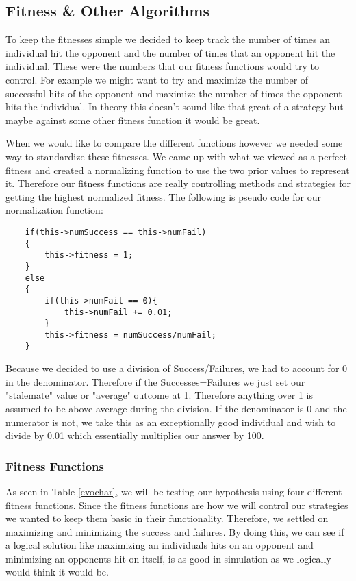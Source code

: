 \documentclass{acm_proc_article-sp}
\begin{document}
\subsection{Fitness \& Other Algorithms} %

To keep the fitnesses simple we decided to keep track the number of times an individual hit the opponent and the number of times that an opponent hit the individual. These were the numbers that our fitness functions would try to control. For example we might want to try and maximize the number of successful hits of the opponent and maximize the number of times the opponent hits the individual. In theory this doesn't sound like that great of a strategy but maybe against some other fitness function it would be great.

When we would like to compare the different functions however we needed some way to standardize these fitnesses. We came up with what we viewed as a perfect fitness and created a normalizing function to use the two prior values to represent it. Therefore our fitness functions are really controlling methods and strategies for getting the highest normalized fitness. The following is pseudo code for our normalization function:
\begin{verbatim}
    if(this->numSuccess == this->numFail)
    {
        this->fitness = 1;
    }
    else
    {
        if(this->numFail == 0){
            this->numFail += 0.01;
        }
        this->fitness = numSuccess/numFail;
    }
\end{verbatim}
Because we decided to use a division of Success/Failures, we had to account for 0 in the denominator. Therefore if the Successes=Failures we just set our "stalemate" value or "average" outcome at 1. Therefore anything over 1 is assumed to be above average during the division. If the denominator is 0 and the numerator is not, we take this as an exceptionally good individual and wish to divide by 0.01 which essentially multiplies our answer by 100.

\subsubsection{Fitness Functions}

As seen in Table \ref{evochar}, we will be testing our hypothesis using four different fitness functions. Since the fitness functions are how we will control our strategies we wanted to keep them basic in their functionality. Therefore, we settled on maximizing and minimizing the success and failures. By doing this, we can see if a logical solution like maximizing an individuals hits on an opponent and minimizing an opponents hit on itself, is as good in simulation as we logically would think it would be.
\end{document}
